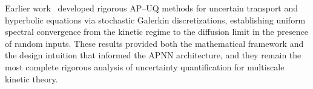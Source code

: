 Earlier work~\cite{APUQ-Jin2017,APUQ-Jin2018} developed rigorous AP--UQ
methods for uncertain transport and hyperbolic equations via stochastic
Galerkin discretizations, establishing uniform spectral convergence from the
kinetic regime to the diffusion limit in the presence of random inputs.  These
results provided both the mathematical framework and the design intuition that
informed the APNN architecture, and they remain the most complete rigorous
analysis of uncertainty quantification for multiscale kinetic theory.
